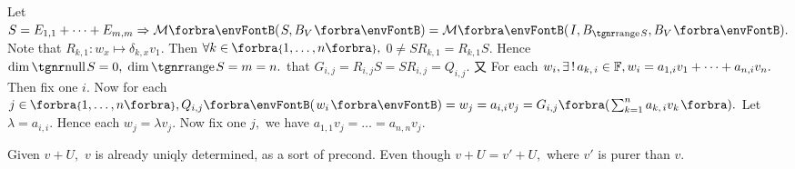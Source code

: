 {\vspace{2pt}Let {$S=E_{1,1}+\dots+E_{m,m}\Rightarrow \Mt{S,B_V}=\Mt{I,B_{\range S},B_V}.$} Note that $R_{k,1}:w_x\mapsto\delta_{k,x}v_1.$}\parSol{}
{\vspace{2pt}Then $\forall k\in\;\!\!\Bra{1,\dots,n},$ {\FontLarge$0\neq SR_{k,1}=R_{k,1}S.$} Hence $\dim\null S=0,\;\dim\range S=m=n.$}\parSol{}
\vspace{2pt}\NOTICE that {\FontLarge$G_{i,j}=R_{i,j}S=SR_{i,j}=Q_{i,j}$}. 又 For each $w_i,\exists\,!\,a_{k,\,i}\in{\mathbb{F}},w_i=a_{1,i}v_1+\dots+a_{n,i}v_n.$\parSol{}
Then fix one $i.$ Now for each $j\in\;\!\!\Bra{1,\dots,n},Q_{i,j}\Par{w_i}=w_j=a_{i,i}v_j=G_{i,j}\BigBigPar{{\sum_{k=1}^na_{k,\,i} v_k}}.$\parSol{}
Let $\lambda=a_{i,i}.$ Hence each $w_j=\lambda v_j.$ Now fix one $j,$ we have $a_{1,1}v_j=\dots=a_{n,n}v_j.$\PfEnd
\SepLine

%
\ChEnd
\pagebreak


\vspace{4pt}

\BulletPointX{}\;\;Given $v+U,$ $v$ is already uniqly determined, as a sort of precond.\TextB{}
Even though $v+U=v'+U,$ where $v'$ is {\tgsl purer} than $v.$
\SepLine

\BulletPointX\NoteForSmall{[3.85]}\;\;
\SepLine

